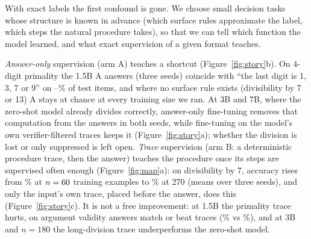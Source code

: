 \documentclass{article}
\theoremstyle{definition}
\begin{document}
With exact labels the first confound is gone. We choose small decision tasks whose structure is known in advance (which surface rules approximate the label, which steps the natural procedure takes), so that we can tell which function the model learned, and what exact supervision of a given format teaches.

\emph{Answer-only} supervision (arm A) teaches a shortcut (Figure~\ref{fig:story}b). On 4-digit primality the 1.5B A answers (three seeds) coincide with ``the last digit is 1, 3, 7 or 9'' on \primeAagreeLastDigitLo--\primeAagreeLastDigitHi\% of test items, and where no surface rule exists (divisibility by 7 or 13) A stays at chance at every training size we ran. At 3B and 7B, where the zero-shot model already divides correctly, answer-only fine-tuning removes that computation from the answers in both seeds, while fine-tuning on the model's own verifier-filtered traces keeps it (Figure~\ref{fig:story}a); whether the division is lost or only suppressed is left open. \emph{Trace} supervision (arm B: a deterministic procedure trace, then the answer) teaches the procedure once its steps are supervised often enough (Figure~\ref{fig:map}a): on divisibility by 7, accuracy rises from \divsevenBnSixty\% at $n=60$ training examples to \divsevenBnTwoSeventy\% at 270 (means over three seeds), and only the input's own trace, placed before the answer, does this (Figure~\ref{fig:story}c). It is not a free improvement: at 1.5B the primality trace hurts, on argument validity answers match or beat traces (\validA\% vs \validB\%), and at 3B and $n=180$ the long-division trace underperforms the zero-shot model.
\end{document}
